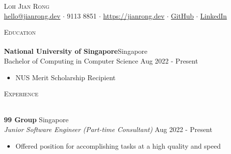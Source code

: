 \documentclass[a4paper]{article}
\newcommand{\lineunder} {
    \vspace*{-8pt} \\
    \hspace*{-12pt} \hrulefill \\
}
\newcommand{\header} [1] {
    {\hspace*{-12pt}\vspace*{6pt} \large\textsc{#1}}
    \vspace*{-6pt} \lineunder
}
\begin{document}
\vspace*{-40pt}

\begin{center}
	{\huge \scshape {Loh Jian Rong}}\\
	\href{mailto:hello@jianrong.dev}{hello@jianrong.dev} $\cdot$ 9113 8851 $\cdot$ \href{https://jianrong.dev}{https://jianrong.dev} $\cdot$ \href{https://github.com/jianrong7}{GitHub} $\cdot$ \href{https://www.linkedin.com/in/jianrong7/}{LinkedIn}\\
\end{center}

\header{Education}
\vspace{1mm}
\textbf{National University of Singapore}\hfill Singapore\\
Bachelor of Computing in Computer Science \hfill Aug 2022 - Present\\
\vspace{-2mm}
\begin{itemize} \itemsep 1pt
	\item NUS Merit Scholarship Recipient
\end{itemize}

\header{Experience}
\vspace{1mm}

\textbf{99 Group} \hfill Singapore\\
\textit{Junior Software Engineer (Part-time Consultant)} \hfill Aug 2022 - Present\\
\vspace{-2mm}
\begin{itemize} \itemsep 1pt
	\item Offered position for accomplishing tasks at a high quality and speed
\end{itemize}
\end{document}

